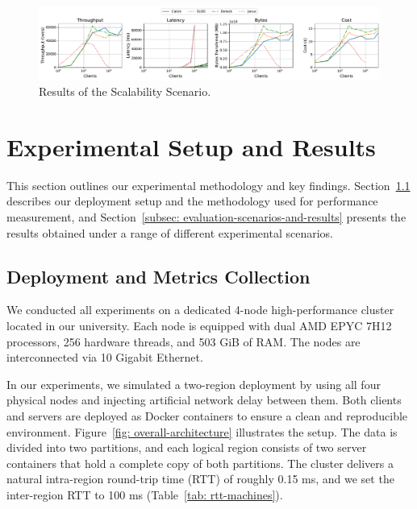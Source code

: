 \begin{figure}[t]
    \centering
    \includegraphics[width=1\textwidth]{figures/Scalability.pdf}
    \caption{Results of the Scalability Scenario.}
    \label{fig: scalability-access-scenario}
\end{figure}

\section{Experimental Setup and Results}
\label{sec: experimental-setup-and-results}
This section outlines our experimental methodology and key findings. Section~\ref{subsec: deployment-and-metrics-collection} describes our deployment setup and the methodology used for performance measurement, and Section~\ref{subsec: evaluation-scenarios-and-results} presents the results obtained under a range of different experimental scenarios.

\subsection{Deployment and Metrics Collection}
\label{subsec: deployment-and-metrics-collection}
We conducted all experiments on a dedicated 4-node high-performance cluster located in our university. Each node is equipped with dual AMD EPYC 7H12 processors, 256 hardware threads, and 503 GiB of RAM. The nodes are interconnected via 10 Gigabit Ethernet.

In our experiments, we simulated a two-region deployment by using all four physical nodes and injecting artificial network delay between them. Both clients and servers are deployed as Docker containers to ensure a clean and reproducible environment. Figure~\ref{fig: overall-architecture} illustrates the setup. The data is divided into two partitions, and each logical region consists of two server containers that hold a complete copy of both partitions. The cluster delivers a natural intra-region round-trip time (RTT) of roughly 0.15 ms, and we set the inter-region RTT to 100 ms (Table~\ref{tab: rtt-machines}).

